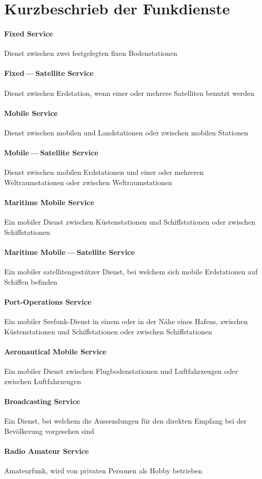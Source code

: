 {\section{Kurzbeschrieb der Funkdienste}
\paragraph{Fixed Service} Dienst zwischen zwei festgelegten fixen Bodenstationen
\paragraph{Fixed — Satellite Service} Dienst zwischen Erdstation, wenn einer oder mehrere Satelliten benutzt werden
\paragraph{Mobile Service} Dienst zwischen mobilen und Landstationen oder zwischen mobilen Stationen
\paragraph{Mobile — Satellite Service} Dienst zwischen mobilen Erdstationen und einer oder mehreren Weltraumstationen oder zwischen Welt­raum­stationen
\paragraph{Maritime Mobile Service} Ein mobiler Dienst zwischen Küstenstationen und Schiffstationen oder zwischen Schiff­sta­tio­nen
\paragraph{Maritime Mobile — Satellite Service} Ein mobiler satellitengestützer Dienst, bei welchem sich mobile Erdstationen auf Schiffen befinden
\paragraph{Port-Operations Service} Ein mobiler Seefunk-Dienst in einem oder in der Nähe eines Hafens, zwischen Küstenstationen und Schiffstationen oder zwischen Schiffstationen
\paragraph{Aeronautical Mobile Service} Ein mobiler Dienst zwischen Flugbodenstationen und Luftfahrzeugen oder zwischen Luftfahr­zeugen
\paragraph{Broadcasting Service} Ein Dienst, bei welchem die Aussendungen für den direkten Empfang bei der Bevölkerung vorgesehen sind
\paragraph{Radio Amateur Service} Amateurfunk, wird von privaten Personen als Hobby betrieben







}